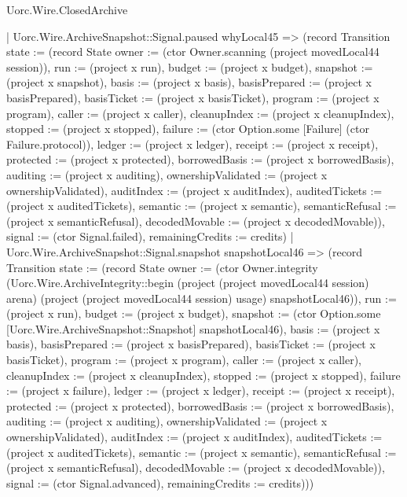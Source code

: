 \begin{lexlean}{Uorc.Wire.ClosedArchive}
\begin{semanticmodule}
{      | Uorc.Wire.ArchiveSnapshot::Signal.paused whyLocal45 => (record Transition {state := (record State {owner := (ctor Owner.scanning (project movedLocal44 session)), run := (project x run), budget := (project x budget), snapshot := (project x snapshot), basis := (project x basis), basisPrepared := (project x basisPrepared), basisTicket := (project x basisTicket), program := (project x program), caller := (project x caller), cleanupIndex := (project x cleanupIndex), stopped := (project x stopped), failure := (ctor Option.some [Failure] (ctor Failure.protocol)), ledger := (project x ledger), receipt := (project x receipt), protected := (project x protected), borrowedBasis := (project x borrowedBasis), auditing := (project x auditing), ownershipValidated := (project x ownershipValidated), auditIndex := (project x auditIndex), auditedTickets := (project x auditedTickets), semantic := (project x semantic), semanticRefusal := (project x semanticRefusal), decodedMovable := (project x decodedMovable)}), signal := (ctor Signal.failed), remainingCredits := credits})
      | Uorc.Wire.ArchiveSnapshot::Signal.snapshot snapshotLocal46 => (record Transition {state := (record State {owner := (ctor Owner.integrity (Uorc.Wire.ArchiveIntegrity::begin (project (project movedLocal44 session) arena) (project (project movedLocal44 session) usage) snapshotLocal46)), run := (project x run), budget := (project x budget), snapshot := (ctor Option.some [Uorc.Wire.ArchiveSnapshot::Snapshot] snapshotLocal46), basis := (project x basis), basisPrepared := (project x basisPrepared), basisTicket := (project x basisTicket), program := (project x program), caller := (project x caller), cleanupIndex := (project x cleanupIndex), stopped := (project x stopped), failure := (project x failure), ledger := (project x ledger), receipt := (project x receipt), protected := (project x protected), borrowedBasis := (project x borrowedBasis), auditing := (project x auditing), ownershipValidated := (project x ownershipValidated), auditIndex := (project x auditIndex), auditedTickets := (project x auditedTickets), semantic := (project x semantic), semanticRefusal := (project x semanticRefusal), decodedMovable := (project x decodedMovable)}), signal := (ctor Signal.advanced), remainingCredits := credits})))
}
\end{semanticmodule}
\end{lexlean}

